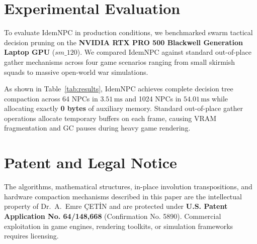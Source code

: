 \documentclass[journal,10pt,twocolumn]{article}
\begin{document}
\section{Experimental Evaluation}
To evaluate IdemNPC in production conditions, we benchmarked swarm tactical decision pruning on the \textbf{NVIDIA RTX PRO 500 Blackwell Generation Laptop GPU} ($sm\_120$). We compared IdemNPC against standard out-of-place gather mechanisms across four game scenarios ranging from small skirmish squads to massive open-world war simulations.

\begin{table}[h]
\centering
\caption{IdemNPC Swarm Decision Latency on Blackwell GPU ($sm\_120$)}
\label{tab:results}
\end{table}

As shown in Table~\ref{tab:results}, IdemNPC achieves complete decision tree compaction across 64 NPCs in $3.51\,\text{ms}$ and 1024 NPCs in $54.01\,\text{ms}$ while allocating exactly \textbf{0 bytes} of auxiliary memory. Standard out-of-place gather operations allocate temporary buffers on each frame, causing VRAM fragmentation and GC pauses during heavy game rendering.

\section{Patent and Legal Notice}
The algorithms, mathematical structures, in-place involution transpositions, and hardware compaction mechanisms described in this paper are the intellectual property of Dr.~A.~Emre \c{C}ET\.{I}N and are protected under \textbf{U.S. Patent Application No. 64/148,668} (Confirmation No. 5890). Commercial exploitation in game engines, rendering toolkits, or simulation frameworks requires licensing.
\end{document}
